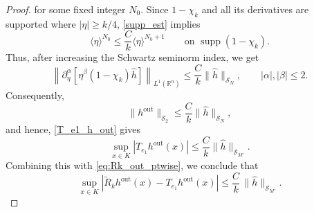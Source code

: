 \documentclass[12pt,a4paper]{amsart}
\numberwithin{equation}{section}
\theoremstyle{plain}
\theoremstyle{definition}
\begin{document}
\begin{proof}
for some fixed integer $N_0$. Since $1-\chi_k$ and all its
derivatives are supported where $|\eta|\geq k/4$, \eqref{supp_est} implies
\begin{equation*}
    \langle\eta\rangle^{N_0}
    \leq
    \frac{C}{k}\langle\eta\rangle^{N_0+1}
    \qquad
    \text{on } \operatorname{supp}(1-\chi_k).
\end{equation*}
Thus, after increasing the Schwartz seminorm index, we get
\begin{equation*}
    \left\|
    \partial_\eta^\alpha\!\left[\eta^\beta(1-\chi_k)\widehat h\right]
    \right\|_{L^1(\mathbb R^n)}
    \leq
    \frac{C}{k}
    \|\widehat h\|_{\mathscr S_N},
    \qquad
    |\alpha|,|\beta|\leq 2.
\end{equation*}
Consequently,
\begin{equation*}
    \|h^{\mathrm{out}}\|_{\mathscr S_2}
    \leq
    \frac{C}{k}\|\widehat h\|_{\mathscr S_N},
\end{equation*}
and hence, \eqref{T_e1_h_out} gives
\begin{equation*}
\sup_{x \in K}
|T_{e_1} h^{\mathrm{out}}(x)|
\leq
\frac{C}{k} \|\widehat{h}\|_{\mathscr{S}_{M'}}.
\end{equation*}
Combining this with \eqref{eq:Rk_out_ptwise}, we conclude that
\begin{equation}\label{eq:exterior_final}
\sup_{x \in K}
\left|
\widetilde{R}_k h^{\mathrm{out}}(x)
-
T_{e_1} h^{\mathrm{out}}(x)
\right|
\le
\frac{C}{k}\,
\|\widehat{h}\|_{\mathscr{S}_{M'}}.
\end{equation}


\end{proof}
\end{document}
